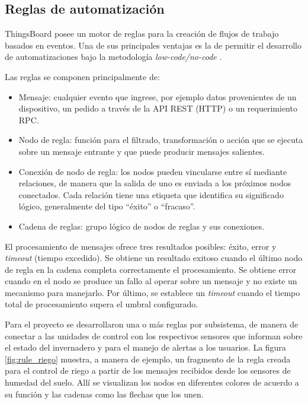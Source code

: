\subsection{Reglas de automatización}
\label{sec:Reglas de automatización}
 
 
ThingsBoard posee un motor de reglas \citep{TB_Rules} para la creación de flujos de trabajo basados en eventos. Una de sus principales ventajas es la de permitir el desarrollo de automatizaciones bajo la metodología \textit{low-code/no-code} \citep{lcnc}.

Las reglas se componen principalmente de:
 
 \begin{itemize}
 \item Mensaje: cualquier evento que ingrese, por ejemplo datos provenientes de un dispositivo, un pedido a través de la API REST (HTTP) o un requerimiento RPC.
 \item Nodo de regla: función para el filtrado, transformación o acción que se ejecuta sobre un mensaje entrante y que puede producir mensajes salientes.
\item Conexión de nodo de regla: los nodos pueden vincularse entre sí mediante relaciones, de manera que la salida de uno es enviada a los próximos nodos conectados. Cada relación tiene una etiqueta que identifica su significado lógico, generalmente del tipo ``éxito'' o ``fracaso''.
\item Cadena de reglas: grupo lógico de nodos de reglas y sus conexiones.

 \end{itemize}


El procesamiento de mensajes ofrece tres resultados posibles: éxito, error y \textit{timeout} (tiempo excedido).  Se obtiene un resultado exitoso cuando el último nodo de regla en la cadena completa correctamente el procesamiento. Se obtiene error cuando en el nodo se produce un fallo al operar sobre un mensaje y no existe un mecanismo para manejarlo. Por último, se establece un \textit{timeout} cuando el tiempo total de procesamiento supera el umbral configurado.



Para el proyecto se desarrollaron una o más reglas por subsistema, de manera de conectar a las unidades de control con los respectivos sensores que informan sobre el estado del invernadero y para el manejo de alertas a los usuarios. La figura \ref{fig:rule_riego} muestra, a manera de ejemplo, un fragmento de la regla creada para el control de riego a partir de los mensajes recibidos desde los sensores de humedad del suelo. Allí se visualizan los nodos en diferentes colores de acuerdo a su función y las cadenas como las flechas que los unen.

